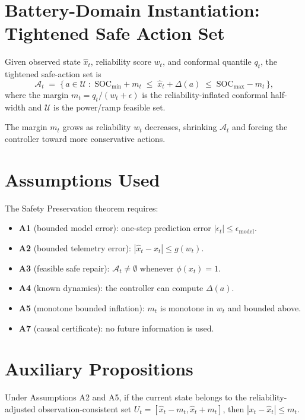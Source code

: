 \section{Battery-Domain Instantiation: Tightened Safe Action Set}

\begin{definition}
\label{def:tightened-set}
Given observed state $\hat{x}_t$, reliability score $w_t$, and conformal
quantile $q_t$, the tightened safe-action set is
\[
  \mathcal{A}_t \;=\; \bigl\{\,a \in \mathcal{U} \;:\;
    \text{SOC}_{\min} + m_t \;\le\; \hat{x}_t + \Delta(a) \;\le\;
    \text{SOC}_{\max} - m_t\,\bigr\},
\]
where the margin $m_t = q_t / (w_t + \epsilon)$ is the reliability-inflated
conformal half-width and $\mathcal{U}$ is the power/ramp feasible set.
\end{definition}

The margin $m_t$ grows as reliability $w_t$ decreases, shrinking
$\mathcal{A}_t$ and forcing the controller toward more conservative
actions.

\section{Assumptions Used}

The Safety Preservation theorem requires:
\begin{itemize}
  \item \textbf{A1} (bounded model error): one-step prediction error
    $|\epsilon_t| \le \epsilon_{\text{model}}$.
  \item \textbf{A2} (bounded telemetry error): $|\hat{x}_t - x_t| \le g(w_t)$.
  \item \textbf{A3} (feasible safe repair): $\mathcal{A}_t \neq \emptyset$
    whenever $\phi(x_t) = 1$.
  \item \textbf{A4} (known dynamics): the controller can compute $\Delta(a)$.
  \item \textbf{A5} (monotone bounded inflation): $m_t$ is monotone in $w_t$
    and bounded above.
  \item \textbf{A7} (causal certificate): no future information is used.
\end{itemize}

\section{Auxiliary Propositions}

\begin{proposition}
\label{prop:margin-dominates}
Under Assumptions A2 and A5, if the current state belongs to the
reliability-adjusted observation-consistent set
$U_t = [\hat{x}_t - m_t,\hat{x}_t + m_t]$, then
$|x_t - \hat{x}_t| \le m_t$.
\end{proposition}

